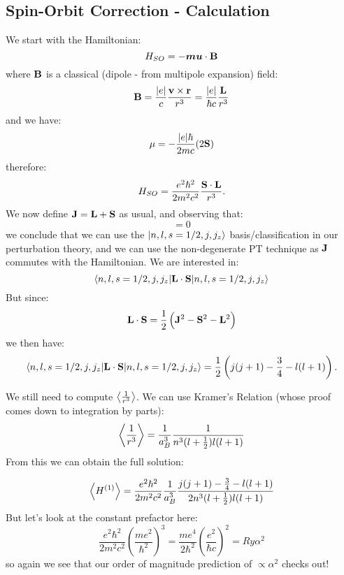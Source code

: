 \subsection{Spin-Orbit Correction - Calculation}
We start with the Hamiltonian:
\begin{equation}
    H_{SO} = -\mbox{\boldmath$ mu $} \cdot \mathbf{B}
\end{equation}
where $\mathbf{B}$ is a classical (dipole - from multipole expansion) field:
\begin{equation}
    \mathbf{B} = \frac{\lvert e \rvert}{c}\frac{\mathbf{v} \times \mathbf{r}}{r^3} = \frac{\lvert e \rvert}{\hbar c}\frac{\mathbf{L}}{r^3}
\end{equation}
and we have:
\begin{equation}
    \mu = -\frac{\lvert e \rvert\hbar}{2mc}(2\mathbf{S})
\end{equation}
therefore:
\begin{equation}
    H_{SO} = \frac{e^2\hbar^2}{2m^2c^2}\frac{\mathbf{S} \cdot \mathbf{L}}{r^3}.
\end{equation}
We now define $\mathbf{J} = \mathbf{L} + \mathbf{S}$ as usual, and observing that:
\begin{equation}
    [H_{SO}, \v{J}_i] = 0
\end{equation}
we conclude that we can use the $\lvert n, l, s=1/2, j, j_z \rangle$ basis/classification in our perturbation theory, and we can use the non-degenerate PT technique as $\mathbf{J}$ commutes with the Hamiltonian. We are interested in:
\begin{equation}
    \langle n,l,s=1/2, j, j_z \rvert\mathbf{L} \cdot \mathbf{S}\lvert n,l,s=1/2, j, j_z \rangle
\end{equation}
But since:
\begin{equation}
    \mathbf{L}\cdot \mathbf{S} = \frac{1}{2}\left(\mathbf{J}^2 - \mathbf{S}^2 - \mathbf{L}^2\right)
\end{equation}
we then have:
\begin{equation}
    \langle n,l,s=1/2, j, j_z \rvert\mathbf{L} \cdot \mathbf{S}\lvert n,l,s=1/2, j, j_z \rangle = \frac{1}{2}\left(j(j+1) - \frac{3}{4} - l(l+1)\right).
\end{equation}

We still need to compute $\left< \frac{1}{r^3} \right>$. We can use Kramer's Relation (whose proof comes down to integration by parts):
\begin{equation}
    \left< \frac{1}{r^3} \right> = \frac{1}{a_B^3}\frac{1}{n^3(l + \frac{1}{2})l(l+1)}
\end{equation}
From this we can obtain the full solution:

\begin{equation}
    \left< H^{(1)} \right> = \frac{e^2\hbar^2}{2m^2c^2}\frac{1}{a_B^3}\frac{j(j+1) - \frac{3}{4} - l(l+1)}{2n^3(l + \frac{1}{2})l(l+1)}
\end{equation}
But let's look at the constant prefactor here:
\begin{equation}
    \frac{e^2\hbar^2}{2m^2c^2}\left(\frac{me^2}{\hbar^2}\right)^3 = \frac{me^4}{2\hbar^2}\left(\frac{e^2}{\hbar c}\right)^2 = \si{Ry}\alpha^2
\end{equation}
so again we see that our order of magnitude prediction of $\propto \alpha^2$ checks out!

